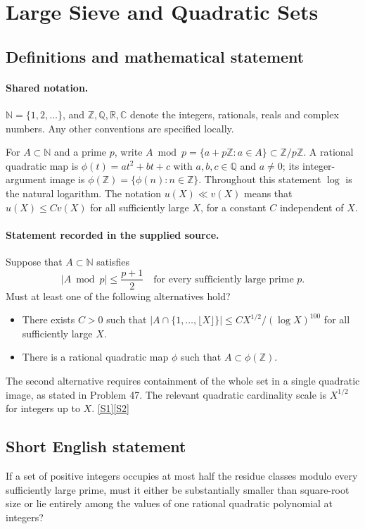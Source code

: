 \documentclass[11pt]{article}
\newcommand{\sref}[2]{\hyperlink{source:#1:#2}{[S#2]}}
\begin{document}
\section{Large Sieve and Quadratic Sets}\label{statement}

\subsection{Definitions and mathematical statement}

\paragraph{Shared notation.}$\mathbb N=\{1,2,\ldots\}$, and $\mathbb Z,\mathbb Q,\mathbb R,\mathbb C$ denote the integers, rationals, reals and complex numbers. Any other conventions are specified locally.


For $A\subset\mathbb N$ and a prime $p$, write $A\bmod p=\{a+p\mathbb Z:a\in A\}\subset\mathbb Z/p\mathbb Z$. A rational quadratic map is $\phi(t)=at^2+bt+c$ with $a,b,c\in\mathbb Q$ and $a\ne0$; its integer-argument image is $\phi(\mathbb Z)=\{\phi(n):n\in\mathbb Z\}$. Throughout this statement $\log$ is the natural logarithm. The notation $u(X)\ll v(X)$ means that $u(X)\le C v(X)$ for all sufficiently large $X$, for a constant $C$ independent of $X$.
\paragraph{Statement recorded in the supplied source.}
Suppose that $A\subset\mathbb N$ satisfies
\[
|A\bmod p|\le\frac{p+1}{2}\quad\text{for every sufficiently large prime }p.
\]
Must at least one of the following alternatives hold?
\begin{itemize}
\item There exists $C>0$ such that $|A\cap\{1,\ldots,\lfloor X\rfloor\}|\le C X^{1/2}/(\log X)^{100}$ for all sufficiently large $X$.
\item There is a rational quadratic map $\phi$ such that $A\subset\phi(\mathbb Z)$.
\end{itemize}
The second alternative requires containment of the whole set in a single quadratic image, as stated in Problem 47. The relevant quadratic cardinality scale is $X^{1/2}$ for integers up to $X$. \sref{statement}{1}\sref{statement}{2}
\subsection{Short English statement}
If a set of positive integers occupies at most half the residue classes modulo every sufficiently large prime, must it either be substantially smaller than square-root size or lie entirely among the values of one rational quadratic polynomial at integers?
\end{document}
